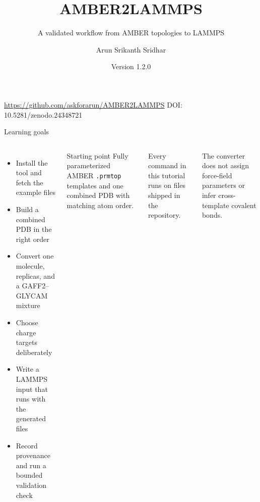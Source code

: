 \documentclass[aspectratio=169,11pt]{beamer}
\title{AMBER2LAMMPS}
\subtitle{A validated workflow from AMBER topologies to LAMMPS}
\author{Arun Srikanth Sridhar}
\institute{Heriot-Watt University}
\date{Version 1.2.0}
\begin{document}
\begin{frame}[plain]
  \vspace{1.3cm}
  \titlepage
  \vfill
  {\color{white}\footnotesize
  \url{https://github.com/askforarun/AMBER2LAMMPS}\hfill
  DOI: 10.5281/zenodo.24348721}
\end{frame}

\begin{frame}{Learning goals}
\begin{columns}[T,onlytextwidth]
\begin{itemize}
  \item Install the tool and fetch the example files
  \item Build a combined PDB in the right order
  \item Convert one molecule, replicas, and a GAFF2--GLYCAM mixture
  \item Choose charge targets deliberately
  \item Write a LAMMPS input that runs with the generated files
  \item Record provenance and run a bounded validation check
\end{itemize}
\begin{block}{Starting point}
Fully parameterized AMBER \texttt{.prmtop} templates and one combined PDB with matching atom order.
\end{block}
\vspace{0.3cm}
Every command in this tutorial runs on files shipped in the repository.
\vspace{0.3cm}

\alert{The converter does not assign force-field parameters or infer cross-template covalent bonds.}
\end{columns}
\end{frame}
\end{document}
